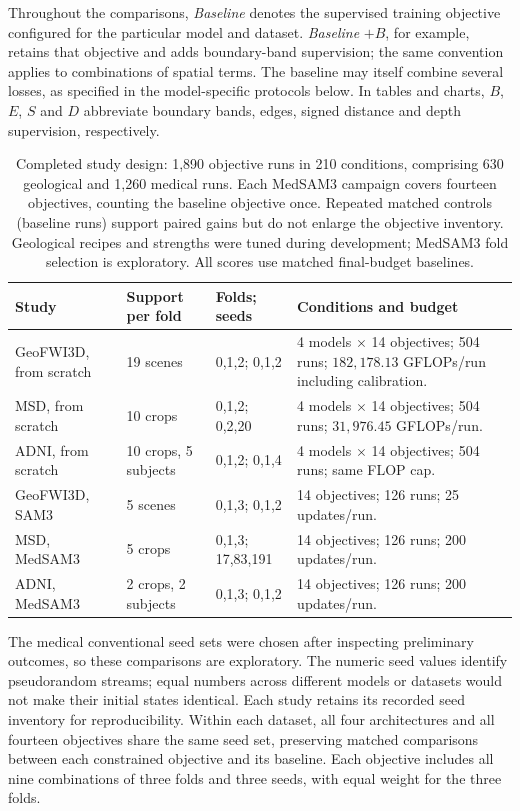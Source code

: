 Throughout the comparisons, \emph{Baseline} denotes the supervised training
objective configured for the particular model and dataset. \emph{Baseline}
$+B$, for example, retains that objective and adds boundary-band
supervision; the same convention applies to combinations of spatial terms.
The baseline may itself combine several losses, as specified in the
model-specific protocols below. In tables and charts, $B$, $E$, $S$ and $D$
abbreviate boundary bands, edges, signed distance and depth supervision,
respectively.

\begin{table}[htbp]
\centering\small{}
\begin{tabular}{@{}P{2.5cm}P{3.0cm}P{3.2cm}P{5.7cm}@{}}
\hline
Study & Support per fold & Folds; seeds & Conditions and budget \\
\hline
GeoFWI3D, from scratch & 19 scenes & 0,1,2; 0,1,2 & 4 models $\times$ 14 objectives; 504 runs; $182{,}178.13$ GFLOPs/run including calibration. \\[.5em]
MSD, from scratch & 10 crops & 0,1,2; 0,2,20 & 4 models $\times$ 14 objectives; 504 runs; $31{,}976.45$ GFLOPs/run. \\[.5em]
ADNI, from scratch & 10 crops, 5 subjects & 0,1,2; 0,1,4 & 4 models $\times$ 14 objectives; 504 runs; same FLOP cap. \\[.5em]
GeoFWI3D, SAM3 & 5 scenes & 0,1,3; 0,1,2 & 14 objectives; 126 runs; 25 updates/run. \\[.5em]
MSD, MedSAM3 & 5 crops & 0,1,3; 17,83,191 & 14 objectives; 126 runs; 200 updates/run. \\[.5em]
ADNI, MedSAM3 & 2 crops, 2 subjects & 0,1,3; 0,1,2 & 14 objectives; 126 runs; 200 updates/run. \\
\hline
\end{tabular}
\caption{Completed study design: 1,890 objective runs in 210 conditions,
comprising 630 geological and 1,260 medical runs.
Each MedSAM3 campaign covers fourteen objectives, counting the baseline
objective once. Repeated matched controls (baseline runs) support paired gains but do
not enlarge the objective inventory.
Geological recipes and strengths were tuned during development;
MedSAM3 fold selection is exploratory.
All scores use matched final-budget baselines.}
\label{tab:experimental-design}
\end{table}

The medical conventional seed sets were chosen after inspecting
preliminary outcomes, so these comparisons are exploratory.
The numeric seed values identify pseudorandom streams; equal numbers
across different models or datasets would not make their initial states
identical. Each study retains its recorded seed inventory for reproducibility.
Within each dataset, all four architectures and all fourteen objectives
share the same seed set,
preserving matched comparisons between each constrained objective and
its baseline. Each objective includes all nine combinations of three
folds and three seeds, with equal weight for the three folds.

